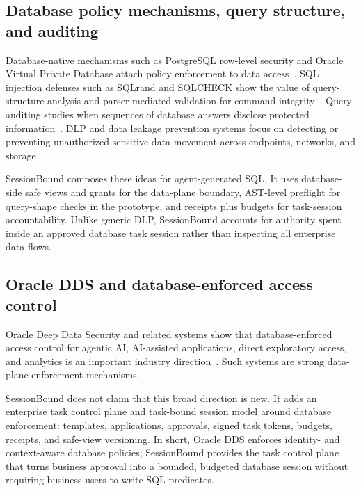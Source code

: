 \documentclass[journal]{IEEEtran}
\begin{document}
\hypertarget{database-policy-mechanisms-query-structure-and-auditing}{%
\subsection{Database policy mechanisms, query structure, and
auditing}\label{database-policy-mechanisms-query-structure-and-auditing}}

Database-native mechanisms such as PostgreSQL row-level security and
Oracle Virtual Private Database attach policy enforcement to data
access~\cite{postgresql2026rowsecurity,oracle2026vpd}. SQL injection
defenses such as SQLrand and SQLCHECK show the value of query-structure
analysis and parser-mediated validation for command
integrity~\cite{boyd2004sqlrand,su2006essence}. Query auditing studies
when sequences of database answers disclose protected
information~\cite{kleinberg2000auditing,nabar2006robustness}. DLP and
data leakage prevention systems focus on detecting or preventing
unauthorized sensitive-data movement across endpoints, networks, and
storage~\cite{alneyadi2016dlps,nist2026dlpglossary}.

SessionBound composes these ideas for agent-generated SQL. It uses
database-side safe views and grants for the data-plane boundary,
AST-level preflight for query-shape checks in the prototype, and
receipts plus budgets for task-session accountability. Unlike generic
DLP, SessionBound accounts for authority spent inside an approved
database task session rather than inspecting all enterprise data flows.

\hypertarget{oracle-dds-and-database-enforced-access-control}{%
\subsection{Oracle DDS and database-enforced access
control}\label{oracle-dds-and-database-enforced-access-control}}

Oracle Deep Data Security and related systems show that
database-enforced access control for agentic AI, AI-assisted
applications, direct exploratory access, and analytics is an important
industry direction~\cite{oracle2026deepdatasecuritydocs,oracle2026deepdatasecuritybrief}.
Such systems are strong data-plane enforcement mechanisms.

SessionBound does not claim that this broad direction is new. It adds an
enterprise task control plane and task-bound session model around
database enforcement: templates, applications, approvals, signed task
tokens, budgets, receipts, and safe-view versioning. In short, Oracle
DDS enforces identity- and context-aware database policies; SessionBound
provides the task control plane that turns business approval into a
bounded, budgeted database session without requiring business users to
write SQL predicates.
\end{document}
